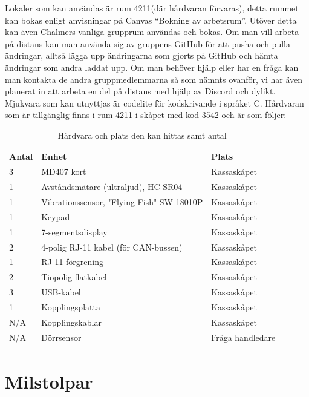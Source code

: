 \documentclass[a4paper]{article}
\begin{document}
Lokaler som kan användas är rum 4211(där hårdvaran förvaras), detta rummet kan
bokas enligt anvisningar på Canvas “Bokning av arbetsrum”. Utöver detta kan
även Chalmers vanliga grupprum användas och bokas. Om man vill arbeta på
distans kan man använda sig av gruppens GitHub för att pusha och pulla
ändringar, alltså lägga upp ändringarna som gjorts på GitHub och hämta ändringar som andra laddat upp. Om man behöver hjälp eller har en fråga kan man kontakta de
andra gruppmedlemmarna så som nämnts ovanför, vi har även planerat in att arbeta en del på
distans med hjälp av Discord och dylikt. Mjukvara som kan utnyttjas är codelite
för kodskrivande i språket C. Hårdvaran som är tillgänglig finns i rum
4211 i skåpet med kod 3542 och är som följer:
\newpage
\begin{table}[h]

\begin{tabular}{ | l | l | l | }
\hline
Antal & Enhet  & Plats \\
\hline\hline
3 & MD407 kort & Kassaskåpet \\
\hline
1 & Avståndsmätare (ultraljud), HC-SR04 & Kassaskåpet \\
\hline
1  & Vibrationssensor, "Flying-Fish" SW-18010P & Kassaskåpet  \\
\hline
1  & Keypad & Kassaskåpet  \\
\hline
1 &7-segmentsdisplay  & Kassaskåpet \\
\hline
2 & 4-polig RJ-11 kabel (för CAN-bussen)& Kassaskåpet \\
\hline
1 & RJ-11 förgrening & Kassaskåpet \\
\hline
2 & Tiopolig flatkabel & Kassaskåpet \\
\hline
3 & USB-kabel & Kassaskåpet \\
\hline
1 & Kopplingsplatta & Kassaskåpet \\
\hline
N/A & Kopplingskablar & Kassaskåpet \\
\hline
N/A & Dörrsensor  & Fråga handledare \\
\hline

\end{tabular}
\caption{Hårdvara och plats den kan hittas samt antal}
\label{Tabell hardvara}
\end{table}

\section{Milstolpar}
\label{sec:milstolpar}
\end{document}
